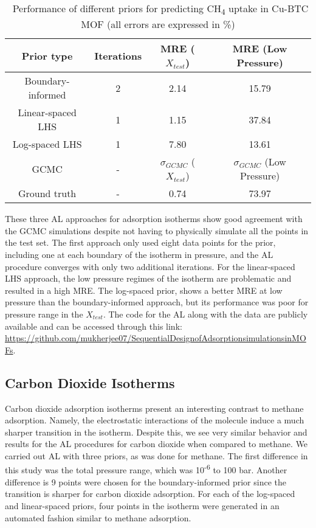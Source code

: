\documentclass[twoside,twocolumn,9pt]{article}
\begin{document}
\begin{table}[ht]
\small
  \caption{\ Performance of different priors for predicting CH\textsubscript{4} uptake in Cu-BTC MOF (all errors are expressed in \%)} 
  \label{tbl:methane_1f}
  \begin{tabular*}{0.48\textwidth}{@{\extracolsep{\fill}}cccc}
    \hline
   Prior type & Iterations & MRE ($X_{test}$) & MRE (Low Pressure)\\
    \hline
    Boundary-informed & 2 & 2.14 & 15.79\\
    Linear-spaced LHS & 1 & 1.15 & 37.84\\
    Log-spaced LHS & 1 & 7.80 & 13.61\\
    \hline
    GCMC & - & $\sigma_{GCMC}$ ($X_{test}$) & $\sigma_{GCMC}$ (Low Pressure)\\ 
    \hline
    Ground truth & - & 0.74 & 73.97\\
    \hline
  \end{tabular*}
\end{table}
These three AL approaches for adsorption isotherms show good agreement with the GCMC simulations despite not having to physically simulate all the points in the test set. The first approach only used eight data points for the prior, including one at each boundary of the isotherm in pressure, and the AL procedure converges with only two additional iterations. For the linear-spaced LHS approach, the low pressure regimes of the isotherm are problematic and resulted in a high MRE. The log-spaced prior, shows a better MRE at low pressure than the boundary-informed approach, but its performance was poor for pressure range in the $X_{test}$. The code for the AL along with the data are publicly available and can be accessed through this link: \href{https://github.com/mukherjee07/Sequential_Design_Adsorption_small_molecules_in_MOFs}{https://github.com/mukherjee07/Sequential\textunderscore Design\textunderscore of\textunderscore\newline Adsorption\textunderscore simulations\textunderscore in\textunderscore MOFs}.

\subsection{Carbon Dioxide Isotherms}

Carbon dioxide adsorption isotherms present an interesting contrast to methane adsorption. Namely, the electrostatic interactions of the molecule induce a much sharper transition in the isotherm. Despite this, we see very similar behavior and results for the AL procedures for carbon dioxide when compared to methane. We carried out AL with three priors, as was done for methane. The first difference in this study was the total pressure range, which was 10\textsuperscript{-6} to 100 bar. Another difference is 9 points were chosen for the boundary-informed prior since the transition is sharper for carbon dioxide adsorption. For each of the log-spaced and linear-spaced priors, four points in the isotherm were generated in an automated fashion similar to methane adsorption.
\end{document}
